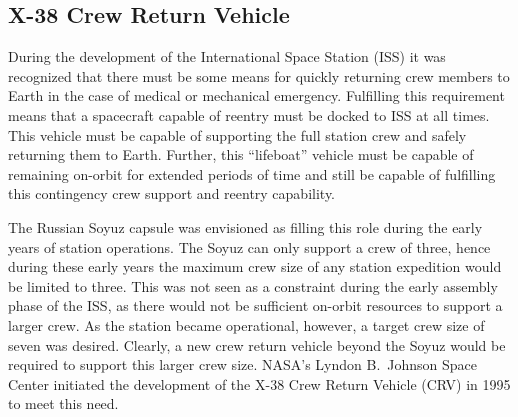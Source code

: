 \clearpage
\subsection{X-38 Crew Return Vehicle\label{sec:x38}}
During the development of the International Space Station (ISS) it was recognized that there must be some means for quickly returning crew members to Earth in the case of medical or mechanical emergency.  Fulfilling this requirement means that a spacecraft capable of reentry must be docked to ISS at all times.  This vehicle must be capable of supporting the full station crew and safely returning them to Earth.  Further, this ``lifeboat'' vehicle must be capable of remaining on-orbit for extended periods of time and still be capable of fulfilling this contingency crew support and reentry capability.

The Russian Soyuz capsule was envisioned as filling this role during the early years of station operations.  The Soyuz can only support a crew of three, hence during these early years the maximum crew size of any station expedition would be limited to three.  This was not seen as a constraint during the early assembly phase of the ISS, as there would not be sufficient on-orbit resources to support a larger crew.  As the station became operational, however, a target crew size of seven was desired.  Clearly, a new crew return vehicle beyond the Soyuz would be required to support this larger crew size.  NASA's Lyndon B.\ Johnson Space Center initiated the development of the X-38 Crew Return Vehicle (CRV) in 1995 to meet this need.

